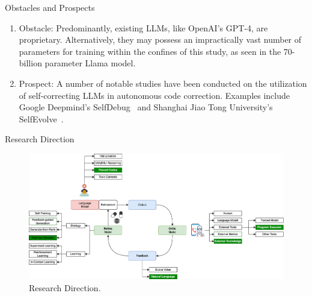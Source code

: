 \begin{frame}{Obstacles and Prospects}
    \begin{enumerate}
        \item Obstacle: Predominantly, existing LLMs, like OpenAI's GPT-4, are proprietary. Alternatively, they may possess an impractically vast number of parameters for training within the confines of this study, as seen in the 70-billion parameter Llama model.

        \item Prospect: A number of notable studies have been conducted on the utilization of self-correcting LLMs in autonomous code correction. Examples include Google Deepmind's SelfDebug~\cite{chen2023teaching} and Shanghai Jiao Tong University's SelfEvolve~\cite{jiang2023selfevolve}.
    \end{enumerate}
\end{frame}

\begin{frame}{Research Direction}
    \begin{figure}[!htb]
        \centering
        \includegraphics[width=1\textwidth]{img/direction_of_research}
        \captionsetup{font=small,labelformat=empty}
        \caption{Research Direction.}
    \end{figure}
\end{frame}

